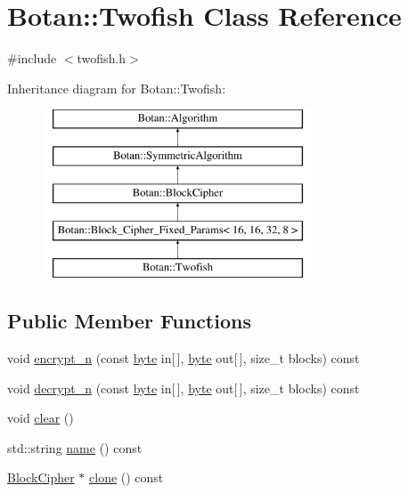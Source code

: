 \hypertarget{classBotan_1_1Twofish}{\section{Botan\-:\-:Twofish Class Reference}
\label{classBotan_1_1Twofish}
}


{\ttfamily \#include $<$twofish.\-h$>$}

Inheritance diagram for Botan\-:\-:Twofish\-:\begin{figure}[H]
\begin{center}
\leavevmode
\includegraphics[height=5.000000cm]{classBotan_1_1Twofish}
\end{center}
\end{figure}
\subsection*{Public Member Functions}
\begin{DoxyCompactItemize}
\item 
void \hyperlink{classBotan_1_1Twofish_a98c96c9c7c5c9edf845608ff1043efd9}{encrypt\-\_\-n} (const \hyperlink{namespaceBotan_a7d793989d801281df48c6b19616b8b84}{byte} in\mbox{[}$\,$\mbox{]}, \hyperlink{namespaceBotan_a7d793989d801281df48c6b19616b8b84}{byte} out\mbox{[}$\,$\mbox{]}, size\-\_\-t blocks) const 
\item 
void \hyperlink{classBotan_1_1Twofish_ab8f56e0476b116368c16cdb1f8c9c0e4}{decrypt\-\_\-n} (const \hyperlink{namespaceBotan_a7d793989d801281df48c6b19616b8b84}{byte} in\mbox{[}$\,$\mbox{]}, \hyperlink{namespaceBotan_a7d793989d801281df48c6b19616b8b84}{byte} out\mbox{[}$\,$\mbox{]}, size\-\_\-t blocks) const 
\item 
void \hyperlink{classBotan_1_1Twofish_acd77aba152e0b6182fc3066e7767215e}{clear} ()
\item 
std\-::string \hyperlink{classBotan_1_1Twofish_a9bba7f522f637f821939a725e7054d5d}{name} () const 
\item 
\hyperlink{classBotan_1_1BlockCipher}{Block\-Cipher} $\ast$ \hyperlink{classBotan_1_1Twofish_ac10e136c1327a53314eb94e6351c94fd}{clone} () const 
\end{DoxyCompactItemize}
